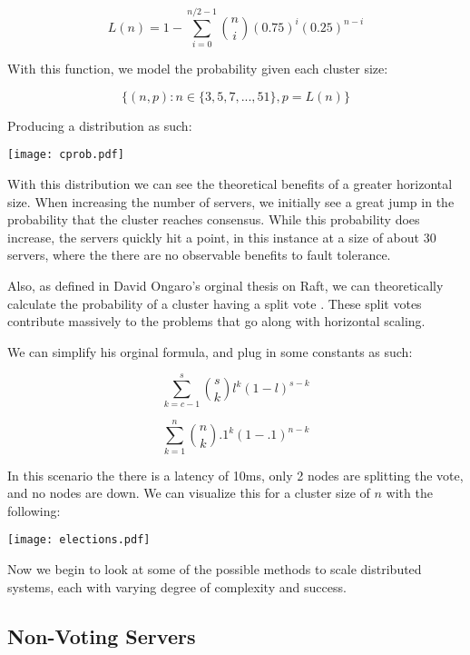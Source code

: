 \[L(n) = 1- \sum_{i=0}^{n/2-1} {n \choose i}(0.75)^{i}(0.25)^{n-i}\]

With this function, we model the probability given each cluster size: 

\[\{(n, p): n \in \{3,5,7,...,51\}, p=L(n)\}\]

\vskip 0.25in

Producing a distribution as such:

\vskip 0.25in

\texttt{[image: cprob.pdf]}


With this distribution we can see the theoretical benefits of a greater horizontal size. When increasing the number of servers, we initially see a great jump in the probability that the cluster reaches consensus. While this probability does increase, the servers quickly hit a point, in this instance at a size of about 30 servers, where the there are no observable benefits to fault tolerance.

Also, as defined in David Ongaro's orginal thesis on Raft, we can theoretically calculate the probability of a cluster having a split vote \cite{RaftDissertation}. These split votes contribute massively to the problems that go along with horizontal scaling.

We can simplify his orginal formula, and plug in some constants as such:

\[\sum_{k=c-1}^{s} {s \choose k} l^{k}(1-l)^{s-k}\]


\[\sum_{k=1}^{n} {n \choose k} .1^{k}(1-.1)^{n-k}\]

In this scenario the there is a latency of 10ms, only 2 nodes are splitting the vote, and no nodes are down. We can visualize this for a cluster size of $n$ with the following:

\texttt{[image: elections.pdf]}


Now we begin to look at some of the possible methods to scale distributed systems, each with varying degree of complexity and success.

\subsection{Non-Voting Servers}

